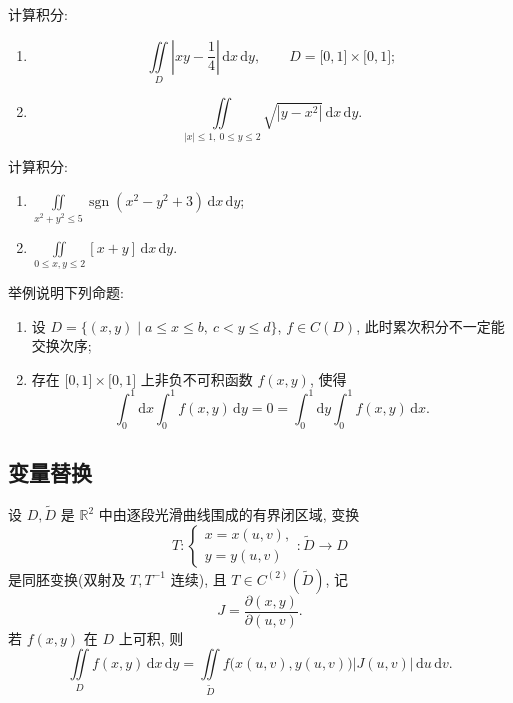 \documentclass[../../数学分析培优讲义.tex]{subfiles}
\begin{document}
\begin{example}
计算积分:
\begin{enumerate}[label=(\arabic*)]
    \item
    \[
        \iint\limits_D\left|xy-\dfrac{1}{4}\right|\,\mathrm{d}x\,\mathrm{d}y,
        \qquad D=\lbrack0,1\rbrack\times\lbrack0,1\rbrack;
    \]
    \item
    \[
        \iint\limits_{|x|\leq1,\ 0\leq y\leq2}\sqrt{|y-x^2|}\,\mathrm{d}x\,\mathrm{d}y.
    \]
\end{enumerate}
\end{example}
\exampleblank

\begin{example}
计算积分:
\begin{enumerate}[label=(\arabic*)]
    \item $\displaystyle\iint\limits_{x^2+y^2\leq5}\operatorname{sgn}(x^2-y^2+3)\,\mathrm{d}x\,\mathrm{d}y$;
    \item $\displaystyle\iint\limits_{0\leq x,y\leq2}[x+y]\,\mathrm{d}x\,\mathrm{d}y$.
\end{enumerate}
\end{example}
\exampleblank

\begin{example}
举例说明下列命题:
\begin{enumerate}[label=(\arabic*)]
    \item 设 $D=\{(x,y)\mid a\leq x\leq b,\ c<y\leq d\}$, $f\in C(D)$, 此时累次积分不一定能交换次序;
    \item 存在 $\lbrack0,1\rbrack\times\lbrack0,1\rbrack$ 上非负不可积函数 $f(x,y)$, 使得
    \[
        \int_0^1\mathrm{d}x\int_0^1f(x,y)\,\mathrm{d}y
        =0
        =\int_0^1\mathrm{d}y\int_0^1f(x,y)\,\mathrm{d}x.
    \]
\end{enumerate}
\end{example}
\exampleblank



\subsection{变量替换}

\begin{theorem}[\markstar]
设 $D,\widetilde D$ 是 $\mathbb{R}^2$ 中由逐段光滑曲线围成的有界闭区域, 变换
\[
    T:\begin{cases}
        x=x(u,v),\\
        y=y(u,v)
    \end{cases}
    :\widetilde D\to D
\]
是同胚变换(双射及 $T,T^{-1}$ 连续), 且 $T\in C^{(2)}(\widetilde D)$, 记
\[
    J=\dfrac{\partial(x,y)}{\partial(u,v)}.
\]
若 $f(x,y)$ 在 $D$ 上可积, 则
\[
    \iint\limits_Df(x,y)\,\mathrm{d}x\,\mathrm{d}y
    =\iint\limits_{\widetilde D}f\bigl(x(u,v),y(u,v)\bigr)|J(u,v)|\,\mathrm{d}u\,\mathrm{d}v.
\]
\end{theorem}
\end{document}
